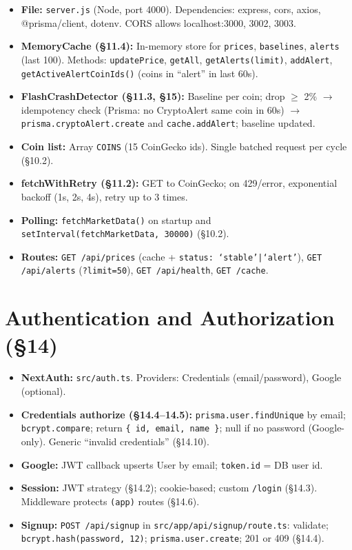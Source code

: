 \documentclass[11pt,a4paper]{report}
\begin{document}
\begin{itemize}[leftmargin=*]
  \item \textbf{File:} \texttt{server.js} (Node, port 4000). Dependencies: express, cors, axios, @prisma/client, dotenv. CORS allows localhost:3000, 3002, 3003.
  \item \textbf{MemoryCache (\S11.4):} In-memory store for \texttt{prices}, \texttt{baselines}, \texttt{alerts} (last 100). Methods: \texttt{updatePrice}, \texttt{getAll}, \texttt{getAlerts(limit)}, \texttt{addAlert}, \texttt{getActiveAlertCoinIds()} (coins in ``alert'' in last 60s).
  \item \textbf{FlashCrashDetector (\S11.3, \S15):} Baseline per coin; drop $\ge$ 2\% $\to$ idempotency check (Prisma: no CryptoAlert same coin in 60s) $\to$ \texttt{prisma.cryptoAlert.create} and \texttt{cache.addAlert}; baseline updated.
  \item \textbf{Coin list:} Array \texttt{COINS} (15 CoinGecko ids). Single batched request per cycle (\S10.2).
  \item \textbf{fetchWithRetry (\S11.2):} GET to CoinGecko; on 429/error, exponential backoff (1s, 2s, 4s), retry up to 3 times.
  \item \textbf{Polling:} \texttt{fetchMarketData()} on startup and \texttt{setInterval(fetchMarketData, 30000)} (\S10.2).
  \item \textbf{Routes:} \texttt{GET /api/prices} (cache + \texttt{status: `stable'|`alert'}), \texttt{GET /api/alerts} (\texttt{?limit=50}), \texttt{GET /api/health}, \texttt{GET /cache}.
\end{itemize}

\section{Authentication and Authorization (\S14)}

\begin{itemize}[leftmargin=*]
  \item \textbf{NextAuth:} \texttt{src/auth.ts}. Providers: Credentials (email/password), Google (optional).
  \item \textbf{Credentials authorize (\S14.4--14.5):} \texttt{prisma.user.findUnique} by email; \texttt{bcrypt.compare}; return \texttt{\{ id, email, name \}}; null if no password (Google-only). Generic ``invalid credentials'' (\S14.10).
  \item \textbf{Google:} JWT callback upserts User by email; \texttt{token.id} = DB user id.
  \item \textbf{Session:} JWT strategy (\S14.2); cookie-based; custom \texttt{/login} (\S14.3). Middleware protects \texttt{(app)} routes (\S14.6).
  \item \textbf{Signup:} \texttt{POST /api/signup} in \texttt{src/app/api/signup/route.ts}: validate; \texttt{bcrypt.hash(password, 12)}; \texttt{prisma.user.create}; 201 or 409 (\S14.4).
\end{itemize}
\end{document}
